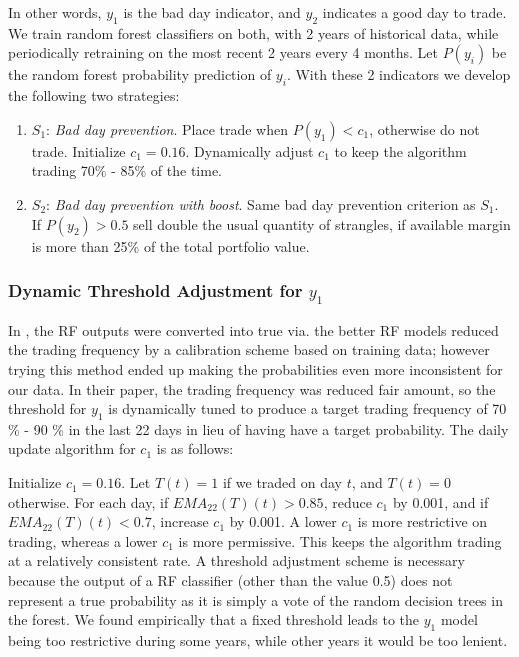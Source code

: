 \documentclass[10pt]{article}
\theoremstyle{definition}
\begin{document}
In other words, $y_1$ is the bad day indicator, and $y_2$ indicates a good day to trade. We train random forest classifiers on both, with 2 years of historical data, while periodically retraining on the most recent 2 years every 4 months. Let $P(y_i)$ be the random forest probability prediction of $y_i$. With these 2 indicators we develop the following two strategies:
\begin{enumerate}
    \item $S_1$: \textit{Bad day prevention}. Place trade when $P(y_1) < c_1$, otherwise do not trade. Initialize $c_1 = 0.16$. Dynamically adjust $c_1$ to keep the algorithm trading 70\% - 85\% of the time.
    \item $S_2$: \textit{Bad day prevention with boost}. Same bad day prevention criterion as $S_1$. If $P(y_2) > 0.5$ sell double the usual quantity of strangles, if available margin is more than 25\% of the total portfolio value.
\end{enumerate}

\subsubsection*{Dynamic Threshold Adjustment for $y_1$}

In \cite{dierckx_trading_2022}, the RF outputs were converted into true via. the better RF models reduced the trading frequency by a calibration scheme based on training data; however trying this method ended up making the probabilities even more inconsistent for our data. In their paper, the trading frequency was reduced fair amount, so the threshold for $y_1$ is dynamically tuned to produce a target trading frequency of 70 \% - 90 \% in the last 22 days in lieu of having have a target probability. The daily update algorithm for $c_1$ is as follows:

Initialize $c_1 = 0.16$. Let $T(t) = 1$ if we traded on day $t$, and $T(t) = 0$ otherwise. For each day, if $EMA_{22}(T)(t) > 0.85$, reduce $c_1$ by 0.001, and if $EMA_{22}(T)(t) < 0.7$, increase $c_1$ by 0.001. A lower $c_1$ is more restrictive on trading, whereas a lower $c_1$ is more permissive. This keeps the algorithm trading at a relatively consistent rate. A threshold adjustment scheme is necessary because the output of a RF classifier (other than the value 0.5) does not represent a true probability as it is simply a vote of the random decision trees in the forest. We found empirically that a fixed threshold leads to the $y_1$ model being too restrictive during some years, while other years it would be too lenient.
\end{document}
